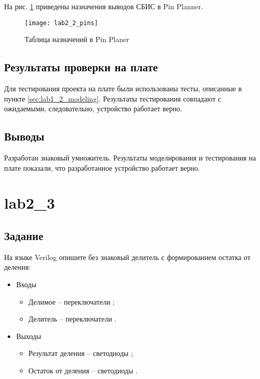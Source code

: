 На рис. \ref{fig:lab2_2_pins} приведены назначения выводов СБИС в Pin Planner.

\begin{figure}[H]
\begin{center}
	\texttt{[image: lab2\_2\_pins]}
	\caption{Таблица назначений в Pin Planer}
	\label{fig:lab2_2_pins}
\end{center}
\end{figure}

\subsection{Результаты проверки на плате}

Для тестирования проекта на плате были использованы тесты, описанные в пункте \ref{sec:lab1_2_modeling}. Результаты тестирования совпадают с ожидаемыми, следовательно, устройство работает верно.

\subsection{Выводы}

Разработан знаковый умножитель. Результаты моделирования и тестирования на плате показали, что разработанное устройство работает верно.

\newpage

\section{lab2\_3}

\subsection{Задание}

На языке Verilog опишите без знаковый делитель с формированием остатка от деления:
\begin{itemize}
\item Входы
	\begin{itemize}
		\item Делимое -- переключатели ;
		\item Делитель -- переключатели .
	\end{itemize}
\item Выходы
	\begin{itemize}
		\item Результат деления -- светодиоды ;
		\item Остаток от деления -- светодиоды .
	\end{itemize}
\end{itemize}

